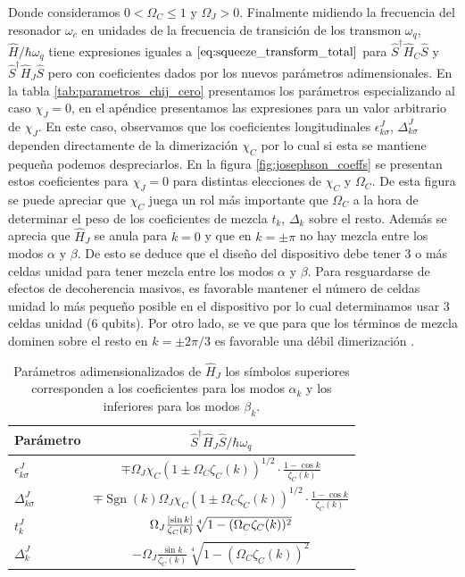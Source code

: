 Donde consideramos $0 < \Omega_C \leq 1$ y $\Omega_J > 0$. Finalmente midiendo la frecuencia del resonador $\omega_c$ en unidades de la frecuencia de transición de los transmon $\omega_q$, $\hat H / \hbar \omega_q$ tiene expresiones iguales a $\eqref{eq:squeeze_transform_total}$ para $\hat S^\dag \hat H_C \hat S$ y $\hat S^\dag \hat H_J \hat S$ pero con coeficientes dados por los nuevos parámetros adimensionales. En la tabla \ref{tab:parametros_chij_cero} presentamos los parámetros especializando al caso $\chi_J = 0$, en el apéndice presentamos las expresiones para un valor arbitrario de $\chi_J$. En este caso, observamos que los coeficientes longitudinales $\epsilon_{k\sigma}^J$, $\Delta_{k\sigma}^J$ dependen directamente de la dimerización $\chi_C$ por lo cual si esta se mantiene pequeña podemos despreciarlos. En la figura \ref{fig:josephson_coeffs} se presentan estos coeficientes para $\chi_J = 0$ para distintas elecciones de $\chi_C$ y $\Omega_C$. De esta figura se puede apreciar que $\chi_C$ juega un rol más importante que $\Omega_C$ a la hora de determinar el peso de los coeficientes de mezcla $t_k$, $\Delta_k$ sobre el resto. Además se aprecia que $\hat H_J$ se anula para $k = 0$ y que en $k=\pm \pi$ no hay mezcla entre los modos $\alpha$ y $\beta$. De esto se deduce que el diseño del dispositivo debe tener 3 o más celdas unidad para tener mezcla entre los modos $\alpha$ y $\beta$. Para resguardarse de efectos de decoherencia masivos, es favorable mantener el número de celdas unidad lo más pequeño posible en el dispositivo por lo cual determinamos usar 3 celdas unidad (6 qubits). Por otro lado, se ve que para que los términos de mezcla dominen sobre el resto en $k=\pm 2\pi/3$ es favorable una débil dimerización .
\begin{table}[h]
\centering
\caption{Parámetros adimensionalizados de $\hat H_J$ los símbolos superiores corresponden a los coeficientes para los modos $\alpha_k$ y los inferiores para los modos $\beta_k$.}
\label{tab:parametros_especializados}
\begin{ruledtabular}
\begin{tabular}{l|c}
Parámetro & $\hat S^\dag\hat H_J \hat S / \hbar \omega_q$ \\
\hline
$\epsilon^J_{k\sigma}$ &  $\mp \Omega_J \chi_C(1\pm \Omega_C \zeta_C(k))^{1/2} \cdot \frac{1-\cos k}{\zeta_C(k)}$ \\
$\Delta^J_{k\sigma}$ &  $\mp \operatorname{Sgn}(k)\Omega_J \chi_C (1\pm \Omega_C\zeta_C(k))^{1/2}\cdot \frac{1-\cos k}{\zeta_C(k)}$ \\
$t^J_k$ & $\Omega_J \frac{\abs{\sin k}}{\zeta_C(k)}\sqrt[4]{1-(\Omega_C \zeta_C(k))^2}$ \\
$\Delta^J_k$ & $-\Omega_J \frac{\sin k}{\zeta_C(k)}\sqrt[4]{1-(\Omega_C \zeta_C(k))^2}$ 
\end{tabular}
\end{ruledtabular}
\end{table}
